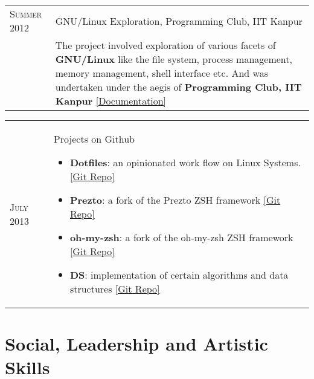 \documentclass[a4paper,10pt]{article} %
\newcommand{\project}[3]{
    \begin{tabular}{>{\raggedleft}p{2.2cm}|p{16.5cm}}
        \textsc{#1} & #2 \\
                    & \footnotesize{#3} \\
    \end{tabular}
}
\newcommand{\projectlist}[3]{
    \begin{tabular}{>{\raggedleft}p{2.2cm}|p{16.5cm}}
        \textsc{#1} & #2
                    \footnotesize{#3}
    \end{tabular}
}
\begin{document}
\project {Summer 2012}
         {GNU/Linux Exploration, Programming Club, IIT Kanpur}
         {The project involved exploration of various facets of
          \textbf{GNU/Linux} like the file system, process management,
          memory management, shell interface etc. And was
          undertaken under the aegis of \textbf{Programming Club, IIT Kanpur}
          \href{https://docs.google.com/document/d/1ZHO9w36aoq3oaZBR4Um1AOmDfiTDAEgM6baQAu3icw4/edit?usp=sharing}
          {[Documentation]} }

\projectlist {July 2013}
         {Projects on Github}
         {
             \begin{itemize}[leftmargin=*]
                 \item \textbf{Dotfiles}: an opinionated work flow on Linux Systems.
                     \href{https://github.com/srijanshetty/dotfiles} {[Git Repo]}
                 \item \textbf{Prezto}: a fork of the Prezto ZSH framework
                     \href{https://github.com/srijanshetty/prezto} {[Git Repo]}
                 \item \textbf{oh-my-zsh}: a fork of the oh-my-zsh ZSH framework
                     \href{https://github.com/srijanshetty/oh-my-zsh} {[Git Repo]}
                 \item \textbf{DS}: implementation of certain algorithms and data structures
                     \href{https://github.com/srijanshetty/DS} {[Git Repo]}
             \end{itemize}
         }


\section {Social, Leadership and Artistic Skills}
\end{document}
